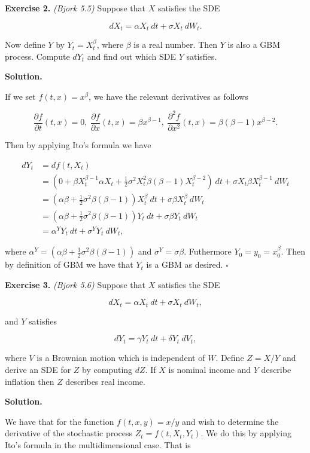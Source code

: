 \documentclass[
]{article}
\begin{document}
\textbf{Exercise 2.} \emph{(Bjork 5.5)} Suppose that \(X\) satisfies the
SDE

\[
dX_t = \alpha X_t\ dt + \sigma X_t\ dW_t.
\]

Now define \(Y\) by \(Y_t = X^\beta_t\), where \(\beta\) is a real
number. Then \(Y\) is also a GBM process. Compute \(dY_t\) and find out
which SDE \(Y\) satisfies.

\textbf{Solution.}

If we set \(f(t,x)=x^\beta\), we have the relevant derivatives as
follows

\[
\frac{\partial f}{\partial t}(t,x)=0,\ \frac{\partial f}{\partial x}(t,x)=\beta x^{\beta -1},\ \frac{\partial^2 f}{\partial x^2}(t,x)=\beta (\beta -1) x^{\beta -2}.
\]

Then by applying Ito's formula we have

\begin{align*}
dY_t&=df(t,X_t)\\
&=\left(0 + \beta X_t^{\beta -1}\alpha X_t+\frac{1}{2}\sigma ^2X_t^2\beta (\beta -1) X_t^{\beta -2}\right)\ dt+\sigma X_t\beta X_t^{\beta -1} \ dW_t\\
&=\left(\alpha \beta+\frac{1}{2}\sigma ^2\beta (\beta -1)\right) X_t^{\beta}\ dt+\sigma \beta X_t^{\beta } \ dW_t\\
&=\left(\alpha \beta+\frac{1}{2}\sigma ^2\beta (\beta -1)\right) Y_t\ dt+\sigma \beta Y_t \ dW_t\\
&= \alpha^Y Y_t\ dt + \sigma^Y Y_t\ dW_t,
\end{align*}

where
\(\alpha^Y=\left(\alpha \beta+\frac{1}{2}\sigma ^2\beta (\beta -1)\right)\)
and \(\sigma^Y =\sigma \beta\). Futhermore \(Y_0=y_0=x_0^\beta\). Then
by definition of GBM we have that \(Y_t\) is a GBM as desired.
\(\square\)

\textbf{Exercise 3.} \emph{(Bjork 5.6)} Suppose that \(X\) satisfies the
SDE

\[
dX_t = \alpha X_t\ dt + \sigma X_t\ dW_t,
\]

and \(Y\) satisfies

\[
dY_t = \gamma Y_t\ dt+\delta Y_t\ dV_t,
\]

where \(V\) is a Brownian motion which is independent of \(W\). Define
\(Z=X/Y\) and derive an SDE for \(Z\) by computing \(dZ\). If \(X\) is
nominal income and \(Y\) describe inflation then \(Z\) describes real
income.

\textbf{Solution.}

We have that for the function \(f(t,x,y)=x/y\) and wish to determine the
derivative of the stochastic process \(Z_t=f(t,X_t,Y_t)\). We do this by
applying Ito's formula in the multidimensional case. That is
\end{document}
